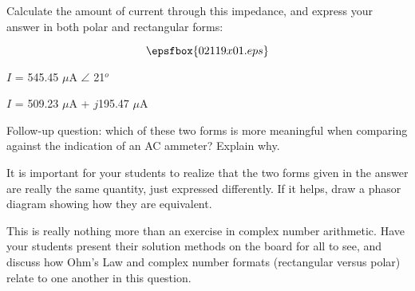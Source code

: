 

Calculate the amount of current through this impedance, and express your answer in both polar and rectangular forms:

$$\epsfbox{02119x01.eps}$$







$I$ = 545.45 $\mu$A $\angle$ 21$^{o}$

$I$ = 509.23 $\mu$A + $j$195.47 $\mu$A

\vskip 10pt

Follow-up question: which of these two forms is more meaningful when comparing against the indication of an AC ammeter?  Explain why.







It is important for your students to realize that the two forms given in the answer are really the same quantity, just expressed differently.  If it helps, draw a phasor diagram showing how they are equivalent.

This is really nothing more than an exercise in complex number arithmetic.  Have your students present their solution methods on the board for all to see, and discuss how Ohm's Law and complex number formats (rectangular versus polar) relate to one another in this question.




